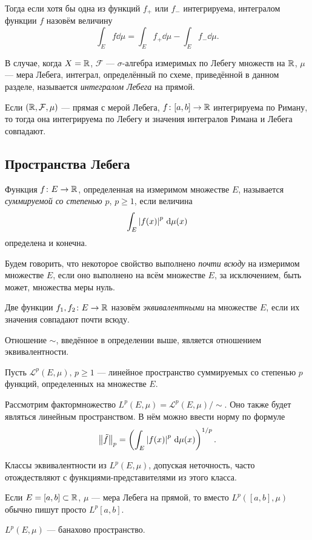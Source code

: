 Тогда если хотя бы одна из функций $f_+$ или $f_-$ интегрируема, интегралом
функции $f$ назовём величину
\[ \int_E f \dd \mu = \int_E f_+ \dd \mu - \int_E f_- \dd \mu. \]

\begin{definition}
    В случае, когда $X = \mathbb{R}$, $\mathcal F$ --- $\sigma$-алгебра измеримых по Лебегу
    множеств на $\mathbb{R}$, $\mu$ --- мера Лебега, интеграл, определённый по схеме,
    приведённой в данном разделе, называется \emph{интегралом Лебега} на прямой.
\end{definition}

\begin{theorem}
    Если $(\mathbb{R}, \mathcal F, \mu)$ --- прямая с мерой Лебега, $\\f \colon [a,
    b] \to \mathbb{R}$ интегрируема по Риману, то тогда она интегрируема по Лебегу
    и значения интегралов Римана и Лебега совпадают.
\end{theorem}

\subsection{Пространства Лебега}
\begin{definition}
    Функция $f \colon E \to \mathbb{R}$, определенная на измеримом множестве $E$,
    называется \emph{суммируемой со степенью $p$}, $p \geq 1$, если величина
    \[ \int_{E} \left|f(x)\right|^p \,\mathrm{d} \mu(x) \]
    определена и конечна.
\end{definition}

\begin{definition}
    Будем говорить, что некоторое свойство выполнено \emph{почти всюду} на измеримом
    множестве $E$, если оно выполнено на всём множестве $E$, за исключением,
    быть может, множества меры нуль.
\end{definition}

\begin{definition}
    Две функции $f_1, f_2 \colon E \to \mathbb{R}$ назовём \emph{эквивалентными} на множестве $E$, если их
    значения совпадают почти всюду.
\end{definition}

Отношение $\sim$, введённое в определении выше, является отношением эквивалентности.

Пусть $\mathcal L^p(E, \mu), \, p \geq 1$ --- линейное пространство суммируемых со степенью
$p$ функций, определенных на множестве $E$.

Рассмотрим фактормножество $L^p(E, \mu) = \mathcal L^p(E, \mu)/\!\sim$. Оно также будет являться линейным
пространством. В нём можно ввести норму по формуле
\[ \left\|\tilde{f}\right\|_p = \left( \int_E \left|f(x)\right|^p \,\mathrm{d} \mu(x)
\right)^{1/p}. \]

Классы эквивалентности из $L^p(E, \mu)$, допуская неточность, часто отождествляют с
функ\-ци\-я\-ми-представителями из этого класса.

Если $E = [a,b] \subset \mathbb{R}$, $\mu$ --- мера Лебега на прямой, то вместо
$L^p([a,b], \mu)$ обычно пишут просто $L^p[a,b]$.

\begin{theorem}[Лебега]
    $L^p(E, \mu)$ --- банахово пространство.
\end{theorem}
